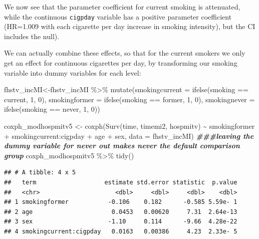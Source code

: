 \documentclass[
]{book}
\newenvironment{Shaded}{\begin{snugshade}}{\end{snugshade}}
\newcommand{\AttributeTok}[1]{\textcolor[rgb]{0.77,0.63,0.00}{#1}}
\newcommand{\DecValTok}[1]{\textcolor[rgb]{0.00,0.00,0.81}{#1}}
\newcommand{\DocumentationTok}[1]{\textcolor[rgb]{0.56,0.35,0.01}{\textbf{\textit{#1}}}}
\newcommand{\FunctionTok}[1]{\textcolor[rgb]{0.00,0.00,0.00}{#1}}
\newcommand{\NormalTok}[1]{#1}
\newcommand{\OtherTok}[1]{\textcolor[rgb]{0.56,0.35,0.01}{#1}}
\newcommand{\SpecialCharTok}[1]{\textcolor[rgb]{0.00,0.00,0.00}{#1}}
\newcommand{\StringTok}[1]{\textcolor[rgb]{0.31,0.60,0.02}{#1}}
\begin{document}
We now see that the parameter coefficient for current smoking is attenuated, while the continuous \texttt{cigpday} variable has a positive parameter coefficient (HR=1.009 with each cigarette per day increase in smoking intensity), but the CI includes the null).

We can actually combine these effects, so that for the current smokers we only get an effect for continuous cigarettes per day, by transforming our smoking variable into dummy variables for each level:

\begin{Shaded}
\begin{Highlighting}[]
\NormalTok{fhstv\_incMI}\OtherTok{\textless{}{-}}\NormalTok{fhstv\_incMI }\SpecialCharTok{\%\textgreater{}\%}
  \FunctionTok{mutate}\NormalTok{(}\AttributeTok{smokingcurrent =} \FunctionTok{ifelse}\NormalTok{(smoking }\SpecialCharTok{==} \StringTok{\textquotesingle{}current\textquotesingle{}}\NormalTok{, }\DecValTok{1}\NormalTok{, }\DecValTok{0}\NormalTok{),}
         \AttributeTok{smokingformer =} \FunctionTok{ifelse}\NormalTok{(smoking }\SpecialCharTok{==} \StringTok{\textquotesingle{}former\textquotesingle{}}\NormalTok{, }\DecValTok{1}\NormalTok{, }\DecValTok{0}\NormalTok{),}
         \AttributeTok{smokingnever =} \FunctionTok{ifelse}\NormalTok{(smoking }\SpecialCharTok{==} \StringTok{\textquotesingle{}never\textquotesingle{}}\NormalTok{, }\DecValTok{1}\NormalTok{, }\DecValTok{0}\NormalTok{))}

\NormalTok{coxph\_modhospmitv5 }\OtherTok{\textless{}{-}} \FunctionTok{coxph}\NormalTok{(}\FunctionTok{Surv}\NormalTok{(time, timemi2, hospmitv) }\SpecialCharTok{\textasciitilde{}} 
\NormalTok{                              smokingformer }\SpecialCharTok{+}\NormalTok{ smokingcurrent}\SpecialCharTok{:}\NormalTok{cigpday }\SpecialCharTok{+}\NormalTok{ age }\SpecialCharTok{+}\NormalTok{ sex,}
                            \AttributeTok{data =}\NormalTok{ fhstv\_incMI) }\DocumentationTok{\#\#\#leaving the dummy variable for \textquotesingle{}never\textquotesingle{} out makes \textquotesingle{}never\textquotesingle{} the default comparison group}
\NormalTok{coxph\_modhospmitv5 }\SpecialCharTok{\%\textgreater{}\%}
  \FunctionTok{tidy}\NormalTok{()}
\end{Highlighting}
\end{Shaded}

\begin{verbatim}
## # A tibble: 4 x 5
##   term                   estimate std.error statistic  p.value
##   <chr>                     <dbl>     <dbl>     <dbl>    <dbl>
## 1 smokingformer           -0.106    0.182      -0.585 5.59e- 1
## 2 age                      0.0453   0.00620     7.31  2.64e-13
## 3 sex                     -1.10     0.114      -9.66  4.28e-22
## 4 smokingcurrent:cigpday   0.0163   0.00386     4.23  2.33e- 5
\end{verbatim}
\end{document}
